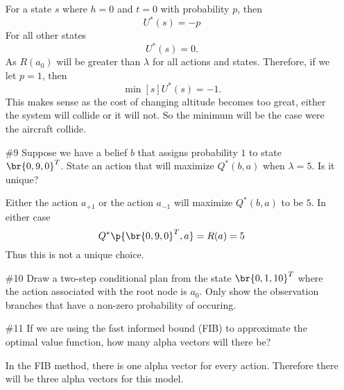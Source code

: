 \documentclass[12pt, oneside]{article}
\begin{document}
\begin{enumerate}
    For a state $s$ where $h = 0$ and $t = 0$ with probability $p$, then
    \[
      U^*(s) = -p
    \]
    For all other states
    \[
      U^*(s) = 0.
    \]
    As $R(a_0)$ will be greater than $\lambda$ for all actions and states.
    Therefore, if we let $p = 1$, then
    \[
      \min[s]{U^*(s)} = -1.
    \]
    This makes sense as the cost of changing altitude becomes too great, either
    the system will collide or it will not.
    So the minimum will be the case were the aircraft collide.

  \item[\#9] %
    Suppose we have a belief $b$ that assigns probability $1$ to state $\br{0, 9, 0}^T$.
    State an action that will maximize $Q^*(b, a)$ when $\lambda = 5$.
    Is it unique?

    Either the action $a_{+1}$ or the action $a_{-1}$ will maximize
    $Q^*(b, a)$ to be $5$.
    In either case
    \[
      Q^*\p{\br{0, 9, 0}^T, a} = R(a) = 5
    \]
    Thus this is not a unique choice.

  \item[\#10] %
    Draw a two-step conditional plan from the state $\br{0, 1, 10}^T$ where the
    action associated with the root node is $a_0$.
    Only show the observation branches that have a non-zero probability of
    occuring.
    \begin{center}
    \end{center}

  \item[\#11] %
    If we are using the fast informed bound (FIB) to approximate the optimal
    value function, how many alpha vectors will there be?

    In the FIB method, there is one alpha vector for every action.
    Therefore there will be three alpha vectors for this model.


\end{enumerate}
\end{document}

